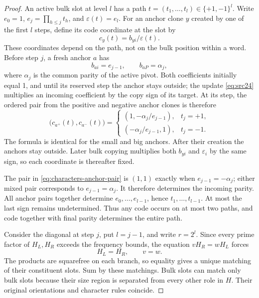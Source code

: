 \begin{proof}
An active bulk slot at level \(l\) has a path
\(t=(t_1,\ldots,t_l)\in\{+1,-1\}^l\).
Write \(e_0=1\), \(e_j=\prod_{h\le j}t_h\), and
\(\varepsilon(t)=e_l\). For an anchor clone \(y\) created
by one of the first \(l\) steps, define its code coordinate
at the slot by
\[
 c_y(t)=b_{yi}/\varepsilon(t).
\]
These coordinates depend on the path, not on the bulk
position within a word.
Before step \(j\), a fresh anchor \(a\) has
\[
 b_{ai}=e_{j-1},\qquad b_{aP}=\alpha_j,
\]
where \(\alpha_j\) is the common parity of the active pivot.
Both coefficients initially equal 1, and until its reserved
step the anchor stays outside; the update
\eqref{eq:src24} multiplies an incoming coefficient by the
copy sign of its target.
At its step, the ordered pair from the positive and negative
anchor clones is therefore
\begin{equation}\label{eq:characters-anchor-pair}
 \big(c_{a^+}(t),c_{a^-}(t)\big)=
 \begin{cases}
   (1,-\alpha_j/e_{j-1}),&t_j=+1,\\
   (-\alpha_j/e_{j-1},1),&t_j=-1.
 \end{cases}
\end{equation}
The formula is identical for the small and big anchors.
After their creation the anchors stay outside. Later bulk
copying multiplies both \(b_{yi}\) and \(\varepsilon_i\)
by the same sign, so each coordinate is thereafter fixed.

The pair in \eqref{eq:characters-anchor-pair} is \((1,1)\)
exactly when \(e_{j-1}=-\alpha_j\); either mixed pair
corresponds to \(e_{j-1}=\alpha_j\). It therefore determines
the incoming parity. All anchor pairs together determine
\(e_0,\ldots,e_{l-1}\), hence
\(t_1,\ldots,t_{l-1}\). At most the last sign remains
undetermined. Thus any code occurs on at most two paths,
and code together with final parity determines the entire
path.

Consider the diagonal at step \(j\), put \(l=j-1\), and
write \(r=2^l\). Since every prime factor of \(H_L,H_R\)
exceeds the frequency bounds, the equation
\(vH_R=wH_L\) forces
\[
 H_L=H_R,\qquad v=w.
\]
The products are squarefree on each branch, so equality gives
a unique matching of their constituent slots. Sum by these
matchings. Bulk slots can match only bulk slots because their
size region is separated from every other role in \(H\).
Their original orientations and character rules coincide.


\end{proof}
